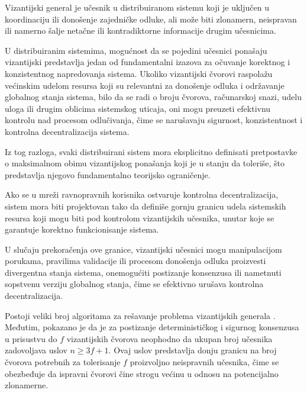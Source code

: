\begin{definicija}
Vizantijski general je učesnik u distribuiranom sistemu koji je uključen u koordinaciju ili donošenje zajedničke odluke, ali može biti zlonamern, neispravan ili namerno šalje netačne ili kontradiktorne informacije drugim učesnicima.
\end{definicija}

U distribuiranim sistemima, mogućnost da se pojedini učesnici ponašaju vizantijski predstavlja jedan od fundamentalni izazova za očuvanje korektnog i konzistentnog napredovanja sistema. Ukoliko vizantijski čvorovi raspolažu većinskim udelom resursa koji su relevantni za donošenje odluka i održavanje globalnog stanja sistema, bilo da se radi o broju čvorova, računarskoj snazi, udelu uloga ili drugim oblicima sistemskog uticaja, oni mogu preuzeti efektivnu kontrolu nad procesom odlučivanja, čime se narušavaju sigurnost, konzistentnost i kontrolna decentralizacija sistema. 

Iz tog razloga, svaki distribuirani sistem mora eksplicitno definisati pretpostavke o maksimalnom obimu vizantijskog ponašanja koji je u stanju da toleriše, što predstavlja njegovo fundamentalno teorijsko ograničenje.

\begin{teorema}\label{teorema:vizantijski-granica}
Ako se u mreži ravnopravnih korisnika ostvaruje kontrolna decentralizacija, sistem mora biti projektovan tako da definiše gornju granicu udela sistemskih resursa koji mogu biti pod kontrolom vizantijskih učesnika, unutar koje se garantuje korektno funkcionisanje sistema.
\end{teorema}

U slučaju prekoračenja ove granice, vizantijski učesnici mogu manipulacijom porukama, pravilima validacije ili procesom donošenja odluka proizvesti divergentna stanja sistema, onemogućiti postizanje konsenzusa ili nametnuti sopstvenu verziju globalnog stanja, čime se efektivno urušava kontrolna decentralizacija.

Postoji veliki broj algoritama za rešavanje problema vizantijskih generala \cite{lamport2019byzantine}. Međutim, pokazano je da je za postizanje determinističkog i sigurnog konsenzusa u prisustvu do $f$ vizantijskih čvorova neophodno da ukupan broj učesnika zadovoljava uslov $n \ge 3f + 1$. Ovaj uslov predstavlja donju granicu na broj čvorova potrebnih za tolerisanje $f$ proizvoljno neispravnih učesnika, čime se obezbeđuje da ispravni čvorovi čine strogu većinu u odnosu na potencijalno zlonamerne.

